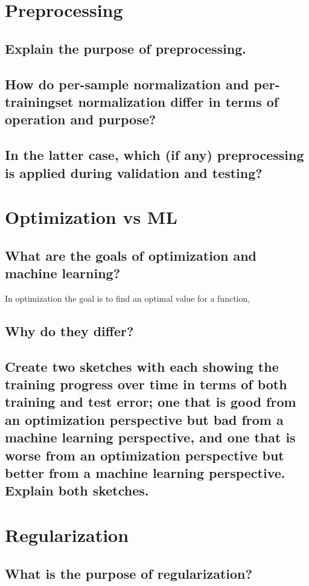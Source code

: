 
\section{Preprocessing}
\subsection{Explain the purpose of preprocessing.}
\subsection{How do per-sample normalization and per-trainingset normalization differ in terms of operation and purpose?}
\subsection{In the latter case, which (if any) preprocessing is applied during validation and testing?}

\section{Optimization vs ML}
\subsection{What are the goals of optimization and machine learning?}
In optimization the goal is to find an optimal value for a function, 
\subsection{Why do they differ?}
\subsection{Create two sketches with each showing the training progress over time in terms of both training and test error; one that is good from an optimization perspective but bad from a machine learning perspective, and one that is worse from an optimization perspective but better from a machine learning perspective. Explain both sketches.}

\section{Regularization}
\subsection{What is the purpose of regularization?}
